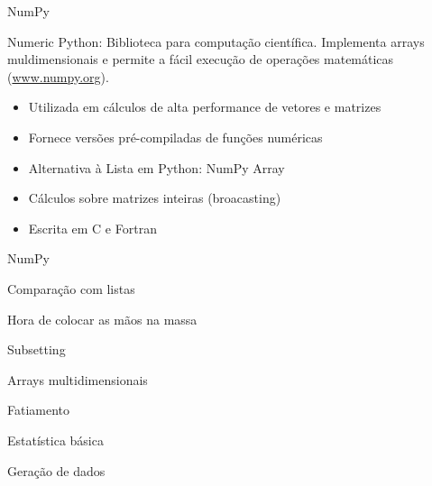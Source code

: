 \begin{frame}[t, fragile]{NumPy}
  \begin{block}{\alert{Num}eric \alert{Py}thon:}
    Biblioteca para computação científica. Implementa arrays muldimensionais e permite a fácil execução de operações matemáticas  (\url{www.numpy.org}).
  \end{block}
  \begin{itemize}
    \item Utilizada em cálculos de alta performance de vetores e matrizes 
    \item Fornece versões pré-compiladas de funções numéricas
    \item Alternativa à Lista em Python: NumPy Array
    \item Cálculos sobre matrizes inteiras (broacasting)
    \item Escrita em C e Fortran
  \end{itemize}
\end{frame}
%
\begin{frame}[t, fragile]{NumPy}
    
\end{frame}
%
\begin{frame}[t, fragile]{Comparação com listas}
    
\end{frame}
%
\begin{frame}[t, fragile]{Hora de colocar as mãos na massa}
\end{frame}
%

\begin{frame}[t, fragile]{Subsetting}
    
\end{frame}
%
\begin{frame}[t, fragile]{Arrays multidimensionais}
    
\end{frame}
%
\begin{frame}{Fatiamento}
    
\end{frame}
%
\begin{frame}[t, fragile]{Estatística básica}
    
\end{frame}
%
\begin{frame}[t, fragile]{Geração de dados}
    
\end{frame}
%

 
 